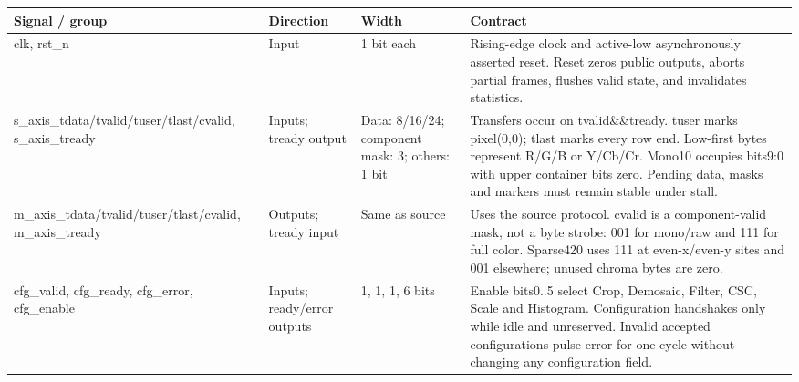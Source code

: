 \documentclass[11pt,a4paper]{article}
\begin{document}
{\small\renewcommand{\arraystretch}{1.18}\begin{longtable}{@{}L{0.21\textwidth}|L{0.12\textwidth}|L{0.12\textwidth}|L{0.45\textwidth}@{}}\toprule

\textbf{Signal /\allowbreak{} group} & \textbf{Direction} & \textbf{Width} & \textbf{Contract}\\\midrule\endhead

clk,\allowbreak{} rst\_\allowbreak{}n & Input & 1 bit each & Rising-edge clock and active-low asynchronously asserted reset. Reset zeros public outputs,\allowbreak{} aborts partial frames,\allowbreak{} flushes valid state,\allowbreak{} and invalidates statistics.\\[2pt]\hline

s\_\allowbreak{}axis\_\allowbreak{}tdata/\allowbreak{}tvalid/\allowbreak{}tuser/\allowbreak{}tlast/\allowbreak{}cvalid,\allowbreak{} s\_\allowbreak{}axis\_\allowbreak{}tready & Inputs; tready output & Data: 8/\allowbreak{}16/\allowbreak{}24; component mask: 3; others: 1 bit & Transfers occur on tvalid\&\&tready. tuser marks pixel(\allowbreak{}0,\allowbreak{}0)\allowbreak{}; tlast marks every row end. Low-first bytes represent R/\allowbreak{}G/\allowbreak{}B or Y/\allowbreak{}Cb/\allowbreak{}Cr. Mono10 occupies bits9:0 with upper container bits zero. Pending data,\allowbreak{} masks and markers must remain stable under stall.\\[2pt]\hline

m\_\allowbreak{}axis\_\allowbreak{}tdata/\allowbreak{}tvalid/\allowbreak{}tuser/\allowbreak{}tlast/\allowbreak{}cvalid,\allowbreak{} m\_\allowbreak{}axis\_\allowbreak{}tready & Outputs; tready input & Same as source & Uses the source protocol. cvalid is a component-valid mask,\allowbreak{} not a byte strobe: 001 for mono/\allowbreak{}raw and 111 for full color. Sparse42\allowbreak{}0 uses 111 at even-x/\allowbreak{}even-y sites and 001 elsewhere; unused chroma bytes are zero.\\[2pt]\hline

cfg\_\allowbreak{}valid,\allowbreak{} cfg\_\allowbreak{}ready,\allowbreak{} cfg\_\allowbreak{}error,\allowbreak{} cfg\_\allowbreak{}enable & Inputs; ready/\allowbreak{}error outputs & 1,\allowbreak{} 1,\allowbreak{} 1,\allowbreak{} 6 bits & Enable bits0..5 select Crop,\allowbreak{} Demosaic,\allowbreak{} Filter,\allowbreak{} CSC,\allowbreak{} Scale and Histogram. Configuration handshakes only while idle and unreserved. Invalid accepted configurations pulse error for one cycle without changing any configuration field.\\[2pt]\hline


\end{longtable}}
\end{document}
